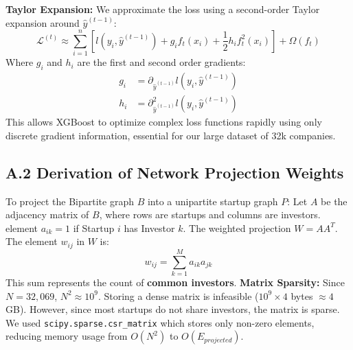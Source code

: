 \documentclass[11pt, a4paper]{article}
\begin{document}
\textbf{Taylor Expansion:}
We approximate the loss using a second-order Taylor expansion around $\hat{y}^{(t-1)}$:
\begin{equation}
    \mathcal{L}^{(t)} \approx \sum_{i=1}^n [l(y_i, \hat{y}^{(t-1)}) + g_i f_t(x_i) + \frac{1}{2}h_i f_t^2(x_i)] + \Omega(f_t)
\end{equation}
Where $g_i$ and $h_i$ are the first and second order gradients:
\begin{align}
    g_i &= \partial_{\hat{y}^{(t-1)}} l(y_i, \hat{y}^{(t-1)}) \\
    h_i &= \partial^2_{\hat{y}^{(t-1)}} l(y_i, \hat{y}^{(t-1)})
\end{align}
This allows XGBoost to optimize complex loss functions rapidly using only discrete gradient information, essential for our large dataset of 32k companies.

\subsection{A.2 Derivation of Network Projection Weights}
To project the Bipartite graph $B$ into a unipartite startup graph $P$:
Let $A$ be the adjacency matrix of $B$, where rows are startups and columns are investors.
element $a_{ik} = 1$ if Startup $i$ has Investor $k$.
The weighted projection $W = AA^T$.
The element $w_{ij}$ in $W$ is:
\begin{equation}
    w_{ij} = \sum_{k=1}^{M} a_{ik} a_{jk}
\end{equation}
This sum represents the count of \textbf{common investors}.
\textbf{Matrix Sparsity:}
Since $N=32,069$, $N^2 \approx 10^9$. Storing a dense matrix is infeasible ($10^9 \times 4$ bytes $\approx 4$ GB). However, since most startups do not share investors, the matrix is sparse. We used \texttt{scipy.sparse.csr\_matrix} which stores only non-zero elements, reducing memory usage from $O(N^2)$ to $O(E_{projected})$.
\end{document}
